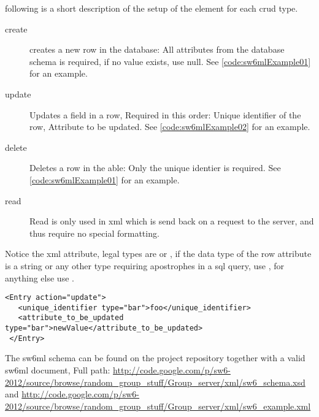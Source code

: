 following is a short description of the setup of the  element for each crud type.

\begin{description}
 \item[create] creates a new row in the database: All attributes from the database schema is required, if no value exists, use null. See \autoref{code:sw6mlExample01} for an example.
 \item[update] Updates a field in a row, Required in this order: Unique identifier of the row, Attribute to be updated. See \autoref{code:sw6mlExample02} for an example.
 \item[delete] Deletes a row in the able: Only the unique identier is required. See \autoref{code:sw6mlExample01} for an example.
 \item[read]   Read is only used in xml which is send back on a request to the server, and thus require no special formatting.
\end{description}

Notice the  xml attribute, legal types are  or , if the data type of the row attribute is a string or any other type requiring apostrophes
in a sql query, use , for anything else use .

\begin{Code}
\begin{lstlisting}[label=code:sw6mlExample02,caption="sw6ml Update syntax example]
 <Entry action="update">
   <unique_identifier type="bar">foo</unique_identifier>
   <attribute_to_be_updated type="bar">newValue</attribute_to_be_updated>
 </Entry>
\end{lstlisting}
\end{Code}

The sw6ml schema can be found on the project repository together with a valid sw6ml document,
Full path: \url{http://code.google.com/p/sw6-2012/source/browse/random_group_stuff/Group_server/xml/sw6_schema.xsd}
and \url{http://code.google.com/p/sw6-2012/source/browse/random_group_stuff/Group_server/xml/sw6_example.xml} %

